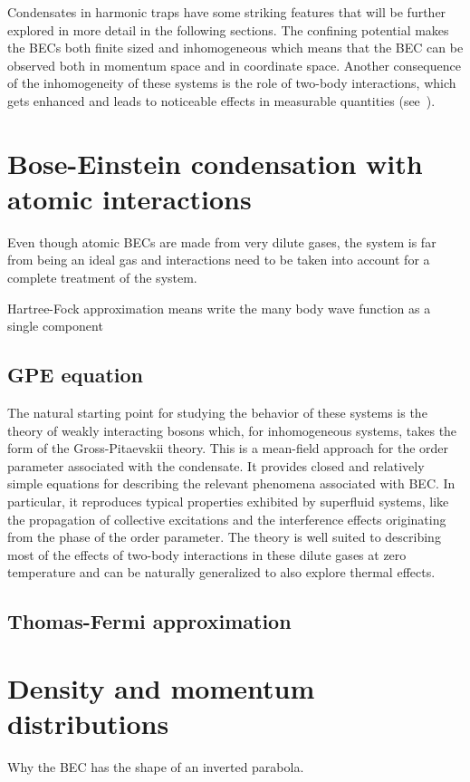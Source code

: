 Condensates in harmonic traps have some striking features that will be further explored in more detail in the following sections. The confining potential makes the BECs both finite sized and inhomogeneous which means that the BEC can be observed both in momentum space and in coordinate space. Another consequence of the inhomogeneity of these systems is the role of two-body interactions, which gets enhanced and leads to noticeable effects in measurable quantities (see~\cite{dalfovo_theory_1999,castin_bose-einstein_1996}).

\section{Bose-Einstein condensation with atomic interactions}

Even though atomic BECs are made from very dilute gases, the system is far from being an ideal gas and interactions need to be taken into account for a complete treatment of the system. 

Hartree-Fock approximation means write the many body wave function as a single component
\subsection{GPE equation}

The natural starting point for studying the behavior of
these systems is the theory of weakly interacting bosons
which, for inhomogeneous systems, takes the form of
the Gross-Pitaevskii theory. This is a mean-field approach for the order parameter associated with the condensate. It provides closed and relatively simple equations for describing the relevant phenomena associated
with BEC. In particular, it reproduces typical properties
exhibited by superfluid systems, like the propagation of
collective excitations and the interference effects originating from the phase of the order parameter. The
theory is well suited to describing most of the effects of
two-body interactions in these dilute gases at zero temperature and can be naturally generalized to also explore thermal effects.
\subsection{Thomas-Fermi approximation}
\section{Density and momentum distributions}
Why the BEC has the shape of an inverted parabola. 

